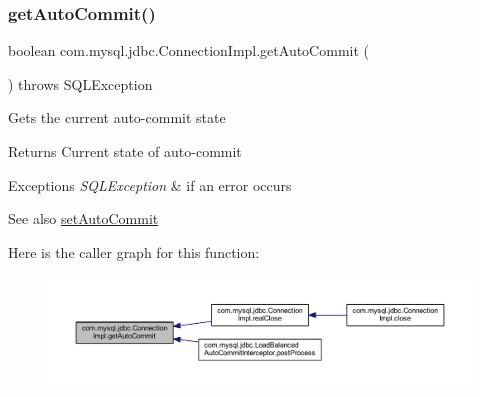 \mbox{\label{classcom_1_1mysql_1_1jdbc_1_1_connection_impl_a29b7b5781a8ac3876760aa1d98b8d25a}} 
\subsubsection{\texorpdfstring{get\+Auto\+Commit()}{getAutoCommit()}}
{\footnotesize\ttfamily boolean com.\+mysql.\+jdbc.\+Connection\+Impl.\+get\+Auto\+Commit (\begin{DoxyParamCaption}{ }\end{DoxyParamCaption}) throws S\+Q\+L\+Exception}

Gets the current auto-\/commit state

\begin{DoxyReturn}{Returns}
Current state of auto-\/commit 
\end{DoxyReturn}

\begin{DoxyExceptions}{Exceptions}
{\em S\+Q\+L\+Exception} & if an error occurs \\
\hline
\end{DoxyExceptions}
\begin{DoxySeeAlso}{See also}
\mbox{\hyperlink{classcom_1_1mysql_1_1jdbc_1_1_connection_impl_aa5a8a261dfc670c3426f7949a56056ca}{set\+Auto\+Commit}} 
\end{DoxySeeAlso}
Here is the caller graph for this function\+:\nopagebreak
\begin{figure}[H]
\begin{center}
\leavevmode
\includegraphics[width=350pt]{classcom_1_1mysql_1_1jdbc_1_1_connection_impl_a29b7b5781a8ac3876760aa1d98b8d25a_icgraph}
\end{center}
\end{figure}
\mbox{\label{classcom_1_1mysql_1_1jdbc_1_1_connection_impl_aa8687ff453437195ecc1ee3d3598e4a6}} 
